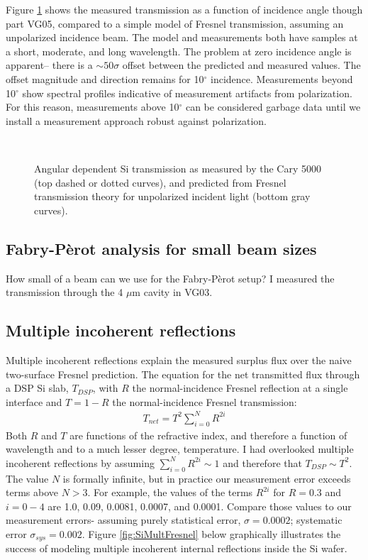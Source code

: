 Figure \ref{fig:AngularSiTrans} shows the measured transmission as a function of incidence angle though part VG05, compared to a simple model of Fresnel transmission, assuming an unpolarized incidence beam.  The model and measurements both have samples at a short, moderate, and long wavelength.  The problem at zero incidence angle is apparent-- there is a $\sim50\sigma$ offset between the predicted and measured values.  The offset magnitude and direction remains for 10$^\circ$ incidence.  Measurements beyond 10$^\circ$ show spectral profiles indicative of measurement artifacts from polarization.  For this reason, measurements above 10$^\circ$ can be considered garbage data until we install a measurement approach robust against polarization.

\begin{figure}[h!] 
\begin{center}
\ 
\caption[Angular dependent Si transmission]{Angular dependent Si transmission as measured by the Cary 5000 (top dashed or dotted curves), and predicted from Fresnel transmission theory for unpolarized incident light (bottom gray curves).}
\label{fig:AngularSiTrans}
\end{center}
\end{figure}


\subsection{Fabry-P\`erot analysis for small beam sizes} 
How small of a beam can we use for the Fabry-P\`erot setup?  
I measured the transmission through the 4 $\mu$m cavity in VG03.


\subsection{Multiple incoherent reflections}

Multiple incoherent reflections explain the measured surplus flux over the naive two-surface Fresnel prediction.  The equation for the net transmitted flux through a DSP Si slab, $T_{DSP}$, with $R$ the normal-incidence Fresnel reflection at a single interface and $T=1-R$ the normal-incidence Fresnel transmission:
\begin{eqnarray}
T_{net}=T^2 \sum_{i=0}^{N}R^{2i} \label{eqn:multsum}
\end{eqnarray}
Both $R$ and $T$ are functions of the refractive index, and therefore a function of wavelength and to a much lesser degree, temperature. I had overlooked multiple incoherent reflections by assuming $\sum_{i=0}^{N}R^{2i} \sim 1$ and therefore that $T_{DSP}\sim T^2 $.  The value $N$ is formally infinite, but in practice our measurement error exceeds terms above $N>3$.  For example, the values of the terms $R^{2i}$ for $R= 0.3$ and $i=0-4$ are 1.0, 0.09, 0.0081, 0.0007, and 0.0001.  Compare those values to our measurement errors- assuming purely statistical error, $\sigma=0.0002$; systematic error $\sigma_{sys}=0.002$.  Figure \ref{fig:SiMultFresnel} below graphically illustrates the success of modeling multiple incoherent internal reflections inside the Si wafer.  

